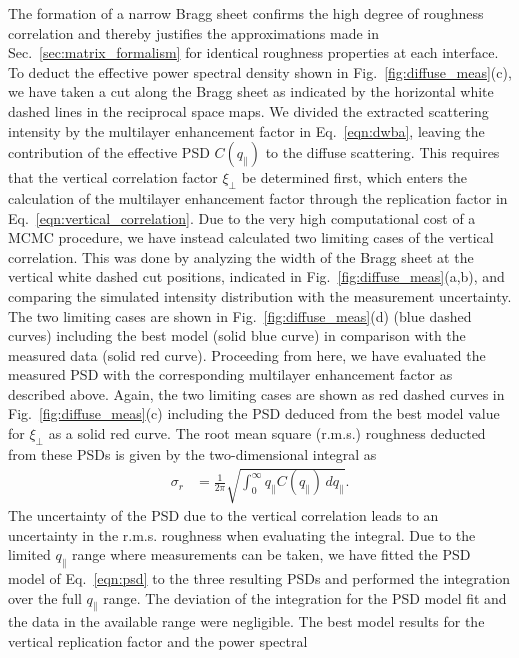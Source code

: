 The formation of a narrow Bragg sheet \cite{haase_role_2014,salditt_kinetic_1994} 
confirms the high degree of roughness correlation and thereby justifies the 
approximations made in Sec.~\ref{sec:matrix_formalism} for identical roughness 
properties at each interface. To deduct the effective power spectral density 
shown in Fig.~\ref{fig:diffuse_meas}(c), we have taken a cut along the Bragg 
sheet as indicated by the horizontal white dashed lines in the reciprocal space 
maps. We divided the extracted scattering intensity by the multilayer 
enhancement factor in Eq.~\ref{eqn:dwba}, leaving the contribution of the 
effective PSD $C(q_\parallel)$ to the diffuse scattering.
This requires that the vertical correlation factor $\xi_\perp$ be determined 
first, which enters the calculation of the multilayer enhancement factor 
through the replication factor in Eq.~\eqref{eqn:vertical_correlation}. Due to 
the very high computational cost of a MCMC procedure, we have instead 
calculated two limiting cases of the vertical correlation. This was done by 
analyzing the width of the Bragg sheet at the vertical white dashed cut 
positions, indicated in Fig.~\ref{fig:diffuse_meas}(a,b), and comparing the 
simulated intensity distribution with the measurement uncertainty. The two 
limiting cases are shown in Fig.~\ref{fig:diffuse_meas}(d) (blue dashed curves) 
including the best model (solid blue curve) in comparison with the measured 
data (solid red curve). Proceeding from here, we have evaluated the measured 
PSD with the corresponding multilayer enhancement factor as described above. 
Again, the two limiting cases are shown as red dashed curves in 
Fig.~\ref{fig:diffuse_meas}(c) including the PSD deduced from the best model 
value for $\xi_\perp$ as a solid red curve. The root mean square (r.m.s.) 
roughness deducted from these PSDs is given by the two-dimensional integral as
\begin{align}
\sigma_r &=\frac{1}{2\pi} \sqrt{\int_{0}^{\infty} q_\parallel C(q_\parallel) \, 
dq_\parallel} \text{.}
\end{align}
The uncertainty of the PSD due to the vertical correlation leads to an 
uncertainty in the r.m.s. roughness when evaluating the integral. Due to the 
limited $q_\parallel$ range where measurements can be taken, we have fitted the 
PSD model of Eq.~\eqref{eqn:psd} to the three resulting PSDs and performed the 
integration over the full $q_\parallel$ range. The deviation of the integration 
for the PSD model fit and the data in the available range were negligible. The 
best model results for the vertical replication factor and the power spectral 
